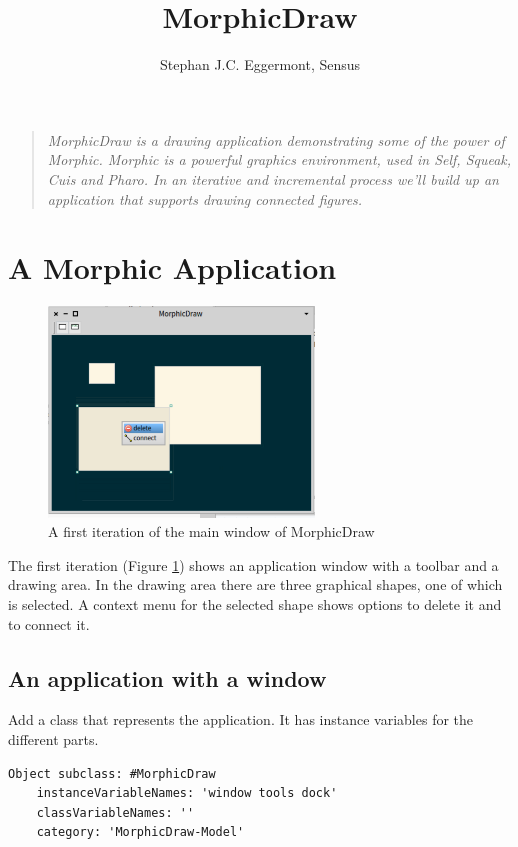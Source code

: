 \documentclass[10pt]{article}   	%
\title{MorphicDraw}
\author{Stephan J.C. Eggermont, Sensus}
\begin{document}
\setlength{\parindent}{0pt}
\maketitle
\begin{quote}
\em
MorphicDraw is a drawing application demonstrating some of the power of Morphic.
Morphic is a powerful graphics environment, used in Self, Squeak, Cuis and Pharo.
In an iterative and incremental process we'll build up an application that supports
drawing connected figures.
\end{quote} 

\section{A Morphic Application}
\begin{figure}[htb]
\begin{center}
\includegraphics[width=200pt]{SimpleMorphicDrawWindow.pdf}
\caption{A first iteration of the main window of MorphicDraw}
\label{1stIteration}
\end{center}
\end{figure}
The first iteration (Figure \ref{1stIteration})  shows an application window 
with a toolbar and a drawing area. In the drawing area there are 
three graphical shapes, one of which is selected. A context menu
for the selected shape shows options to delete it and to connect it.

\subsection{An application with a window}
Add a class that represents the application. It has instance variables for 
the different parts. 

\begin{verbatim}
Object subclass: #MorphicDraw
    instanceVariableNames: 'window tools dock'
    classVariableNames: ''
    category: 'MorphicDraw-Model'
\end{verbatim}
\end{document}
